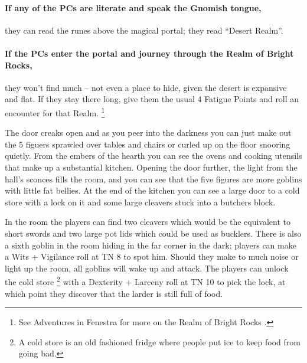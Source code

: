 \begin{multicols}{2}
\begin{boxtext}
\end{boxtext}

\paragraph{If any of the PCs are literate and speak the Gnomish tongue,}
they can read the runes above the magical portal; they read ``Desert Realm''.

\paragraph{If the PCs enter the portal and journey through the Realm of Bright Rocks,}
they won't find much -- not even a place to hide, given the desert is expansive and flat.
If they stay there long, give them the usual 4 Fatigue Points and roll an encounter for that Realm.%
\footnote{See Adventures in Fenestra for more on the Realm of Bright Rocks\iftoggle{aif}{%
	, page \pageref{brightrocks}}%
	{}%
.}


\begin{boxtext}

The door creaks open and as you peer into the darkness you can just make out the 5 figuers sprawled over tables and chairs or curled up on the floor snooring quietly. 
From the embers of the hearth you can see the ovens and cooking utensils that make up a substantial kitchen. 
Opening the door further, the light from the hall's sconces fills the room, and you can see that the five figures are more goblins with little fat bellies.
At the end of the kitchen you can see a large door to a cold store with a lock on it and some large cleavers stuck into a butchers block.

\end{boxtext}

\noindent
In the room the players can find two cleavers which would be the equivalent to short swords and two large pot lids which could be used as bucklers.
There is also a sixth goblin in the room hiding in the far corner in the dark; players can make a Wits + Vigilance roll at TN 8 to spot him.
Should they make to much noise or light up the room, all goblins will wake up and attack.
The players can unlock the cold store
\footnote{A cold store is an old fashioned fridge where people put ice to keep food from going bad.}%
with a Dexterity + Larceny roll at TN 10 to pick the lock, at which point they discover that the larder is still full of food.



\end{multicols}
